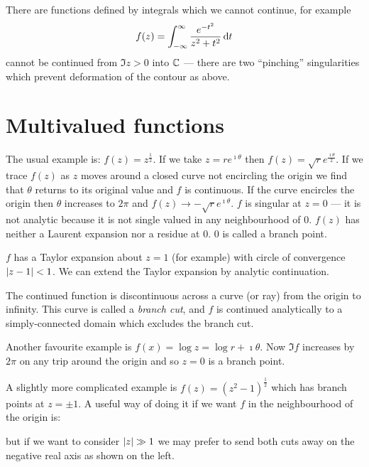 \documentclass{notes}
\theoremstyle{plain}
\begin{document}
There are functions defined by integrals which we cannot continue, for
example
\[
f(z) = \int_{-\infty}^\infty \frac{e^{-t^2}}{z^2+t^2}\, \mathrm{d} t
\]
cannot be continued from $\Im z > 0$ into $\mathbb{C}$ --- there are two
``pinching'' singularities which prevent deformation of the contour as
above.

\section{Multivalued functions}

The usual example is: $f(z) = z^{\frac{1}{2}}$.  If we take
$z = r e^{\imath \theta}$ then $f(z) = \sqrt{r} e^{\frac{\imath \theta}{2}}$.
If we trace $f(z)$ as $z$ moves around a closed curve not encircling the
origin we find that $\theta$ returns to its original value and $f$ is
continuous.  If the curve encircles the origin then $\theta$ increases
to $2 \pi$ and $f(z) \to - \sqrt{r} e^{\imath \theta}$.  $f$ is
singular at $z=0$ --- it is not analytic because it is not single valued
in any neighbourhood of $0$.  $f(z)$ has neither a Laurent expansion nor a
residue at $0$.  $0$ is called a branch point.

$f$ has a Taylor expansion about $z=1$ (for example) with circle of
convergence $\left|z-1\right| < 1$.  We can extend the Taylor expansion by
analytic continuation.

\vspace{1.5in}

The continued function is discontinuous across a curve (or ray) from
the origin to infinity.  This curve is called a \emph{branch cut},
and $f$ is continued analytically to a simply-connected domain which excludes
the branch cut.

Another favourite example is $f(x) = \log z = \log r + \imath \theta$.
Now $\Im f$ increases by $2 \pi$ on any trip around the origin and so $z=0$
is a branch point.

\vspace{1in}

A slightly more complicated example is $f(z) = \left( z^2 -1
\right)^{\frac{1}{2}}$ which has branch points at $z = \pm 1$.  A
useful way of doing it if we want $f$ in the neighbourhood of the origin
is:
\vspace{1in}

but if we want to consider $\left|z\right| \gg 1$ we may prefer to send both
cuts away on the negative real axis as shown on the left.

\vspace{1in}
\end{document}
